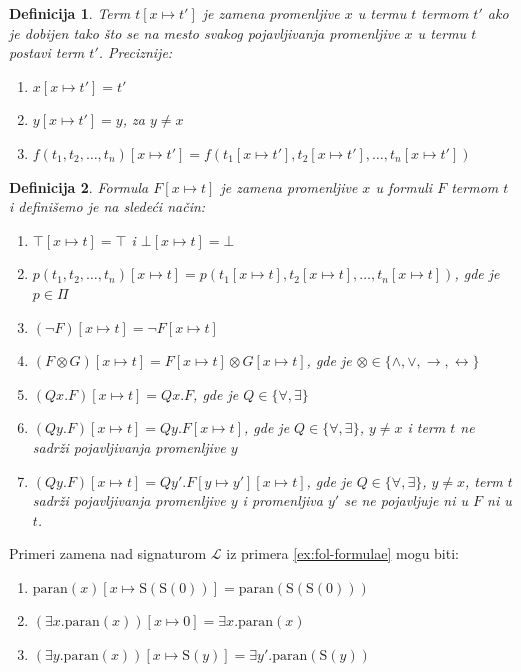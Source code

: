 \documentclass[a4paper,10pt]{article}
\newtheorem{definition}{Definicija}[section]
\theoremstyle{remark}
\newenvironment{example}
  {\pushQED{\qed}\renewcommand{\qedsymbol}{$\triangle$}\examplex}
  {\popQED\endexamplex}
\begin{document}
\begin{definition}
    Term $t[x \mapsto t']$ je zamena promenljive $x$ u termu $t$ termom $t'$ ako
    je dobijen tako što se na mesto svakog pojavljivanja promenljive $x$ u termu
    $t$ postavi term $t'$. Preciznije:
    \begin{enumerate}
        \itemsep-0.3em
        \item $x[x \mapsto t'] = t'$
        \item $y[x \mapsto t'] = y$, za $y \neq x$
        \item $f(t_1, t_2, \dots, t_n)[x \mapsto t']
        = f(t_1[x \mapsto t'], t_2[x \mapsto t'], \ldots, t_n[x \mapsto t'])$
    \end{enumerate}
\end{definition}

\begin{definition}
    Formula $F[x \mapsto t]$ je zamena promenljive $x$ u formuli $F$ termom $t$
    i definišemo je na sledeći način:
    \begin{enumerate}
        \itemsep-0.3em
        \item $\top [x \mapsto t] = \top$ i $\bot [x \mapsto t] = \bot$
        \item $p(t_1, t_2, \dots, t_n)[x \mapsto t]
        = p(t_1[x \mapsto t], t_2[x \mapsto t], \ldots, t_n[x \mapsto t])$, gde
        je $p \in \Pi$
        \item $(\neg F)[x \mapsto t] = \neg F[x \mapsto t]$
        \item $(F \otimes G)[x \mapsto t]
        = F[x \mapsto t] \otimes G[x \mapsto t]$, gde je
        $\otimes \in \{\land, \lor, \rightarrow, \leftrightarrow\}$
        \item $(Qx. F)[x \mapsto t] = Qx. F$,
        gde je $Q \in \{\forall, \exists\}$
        \item $(Qy. F)[x \mapsto t] = Qy. F[x \mapsto t]$, gde je
        $Q \in \{\forall, \exists\}$, $y \neq x$ i term $t$ ne sadrži
        pojavljivanja promenljive $y$
        \item $(Qy. F)[x \mapsto t] = Qy'. F[y \mapsto y'][x \mapsto t]$, gde je
        $Q \in \{\forall, \exists\}$, $y \neq x$, term $t$ sadrži pojavljivanja
        promenljive $y$ i promenljiva $y'$ se ne pojavljuje ni u $F$ ni u $t$.
    \end{enumerate}
\end{definition}

\begin{example}
    Primeri zamena nad signaturom $\mathcal{L}$ iz primera \ref{ex:fol-formulae}
    mogu biti:
    \begin{enumerate}[label=(\arabic*)]
        \itemsep-0.3em
        \item $\mathrm{paran}(x)[x \mapsto \mathrm{S}(\mathrm{S}(0))]
        = \mathrm{paran}(\mathrm{S}(\mathrm{S}(0)))$
        \item $(\exists x. \mathrm{paran}(x))[x \mapsto 0]
        = \exists x. \mathrm{paran}(x)$
        \item $(\exists y. \mathrm{paran}(x))[x \mapsto \mathrm{S}(y)]
        = \exists y'. \mathrm{paran}(\mathrm{S}(y))$
    \end{enumerate}
\end{example}
\end{document}
